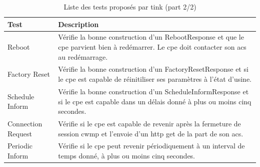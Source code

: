 \documentclass[12pt,a4paper]{report}
\begin{document}
\begin{appendix}
\begin{table}
	\begin{tabularx}{17cm}{|l|X|}
		\hline
		Test & Description\tabularnewline
		\hline
		Reboot & Vérifie la bonne construction d'un RebootResponse et que le \gls{cpe} parvient bien à redémarrer. Le \gls{cpe} doit contacter son \gls{acs} au redémarrage.\tabularnewline
		\hline
		Factory Reset & Vérifie la bonne construction d'un FactoryResetResponse et si le \gls{cpe} est capable de réinitiliser ses paramètres à l'état d'usine. \tabularnewline
		\hline
		Schedule Inform & Vérifie la bonne construction d'un ScheduleInformResponse et si le \gls{cpe} est capable dans un délais donné à plus ou moins cinq secondes. \tabularnewline
		\hline
		Connection Request & Vérifie si le \gls{cpe} est capable de revenir après la fermeture de session \gls{cwmp} et l'envoie d'un \gls{http} get de la part de son \gls{acs}. \tabularnewline
		\hline
		Periodic Inform & Vérifie si le \gls{cpe} peut revenir périodiquement à un interval de temps donné, à plus ou moins cinq secondes. \tabularnewline
		\hline
	\end{tabularx}
	\centering
	\caption{Liste des tests proposés par \gls{tink} (part 2/2)}
\end{table}



\end{appendix}
\end{document}
